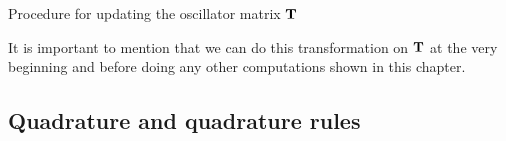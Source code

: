 \documentclass[a4paper,10pt]{article}
\begin{document}
\begin{algorithm}
  \caption{Procedure for updating the oscillator matrix $\mathbf{T}$}
  \label{al:oscillator_update}
  \begin{algorithmic}
      \State{} 
      \EndFor
      \State{} 
        \EndFor
      \EndFor
    \EndFor
  \end{algorithmic}
\end{algorithm}

It is important to mention that we can do this transformation on $\mathbf{T}$
at the very beginning and before doing any other computations shown
in this chapter.


\subsection{Quadrature and quadrature rules}
\end{document}
